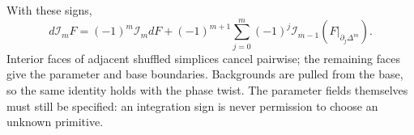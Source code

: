 With these signs,
\begin{equation}\label{eq:Stokes}
 d\mathcal I_mF=(-1)^m\mathcal I_m dF
 +(-1)^{m+1}\sum_{j=0}^{m}(-1)^j\mathcal I_{m-1}(F|_{\partial_j\Delta^m}).
\end{equation}
Interior faces of adjacent shuffled simplices cancel pairwise; the remaining faces give the parameter and base boundaries. Backgrounds are pulled from the base, so the same identity holds with the phase twist. The parameter fields themselves must still be specified: an integration sign is never permission to choose an unknown primitive.
